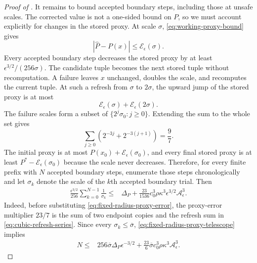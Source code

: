 \documentclass{article}
\begin{document}
\begin{proof}[Proof of ]
It remains to bound accepted boundary steps, including those at unsafe
scales.  The corrected value is not a one-sided bound on $P$, so we
must account explicitly for changes in the stored proxy.  At scale
$\sigma$, \eqref{eq:working-proxy-bound} gives
\[
 |\widehat P-P(x)|\le\mathcal E_\epsilon(\sigma).
\]
Every accepted boundary step decreases the stored proxy by at least
$\epsilon^{3/2}/(256\sigma)$.  The candidate tuple becomes the next
stored tuple without recomputation.  A failure leaves $x$ unchanged,
doubles the scale, and recomputes the current tuple.  At such a refresh
from $\sigma$ to $2\sigma$, the upward jump of the stored proxy is at
most
\begin{equation}\label{eq:proxy-refresh-jump}
 \mathcal E_\epsilon(\sigma)
 +\mathcal E_\epsilon(2\sigma).
\end{equation}
The failure scales form a subset of
$\{2^j\sigma_0:j\ge0\}$.  Extending the sum to the whole set gives
\begin{equation}\label{eq:cubic-refresh-series}
 \sum_{j\ge0}\left(2^{-3j}+2^{-3(j+1)}\right)=\frac97.
\end{equation}
The initial proxy is at most
$P(x_0)+\mathcal E_\epsilon(\sigma_0)$, and every final stored proxy is
at least $P^*-\mathcal E_\epsilon(\sigma_0)$ because the scale never
decreases.  Therefore, for every finite prefix with $N$ accepted
boundary steps, enumerate those steps chronologically and let
$\sigma_k$ denote the scale of the $k$th accepted boundary trial.  Then
\begin{align}
 \frac{\epsilon^{3/2}}{256}
 \sum_{k=0}^{N-1}\frac1{\sigma_k}
 \le{}&\Delta_P
 +\frac{23}{1536}c_0^3\rho\kappa^3
      \epsilon^{3/2}\mathcal A_\epsilon^3.
 \label{eq:fixed-radius-proxy-telescope}
\end{align}
Indeed, before substituting \eqref{eq:fixed-radius-proxy-error}, the
proxy-error multiplier $23/7$ is the sum of two endpoint copies and the
refresh sum in \eqref{eq:cubic-refresh-series}.
Since every $\sigma_k\le\overline\sigma$,
\eqref{eq:fixed-radius-proxy-telescope} implies
\begin{align}
 N\le{}&256\overline\sigma\Delta_P\epsilon^{-3/2}
 +\frac{23}{6}\overline\sigma
   c_0^3\rho\kappa^3\mathcal A_\epsilon^3.
 \label{eq:fixed-radius-boundary-count}
\end{align}


\end{proof}
\end{document}
